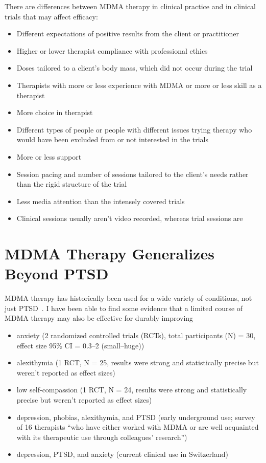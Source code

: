 \documentclass[11pt,oneside]{book}
\let\cite\parencite
\begin{document}
There are differences between MDMA therapy in clinical practice and in clinical trials that may affect efficacy:
\begin{itemize}
    \item Different expectations of positive results from the client or practitioner
    \item Higher or lower therapist compliance with professional ethics
    \item Doses tailored to a client's body mass, which did not occur during the trial~\cite{mitchellMDMAClinicalTrial,mitchellMDMAClinicalTrial2}
    \item Therapists with more or less experience with MDMA or more or less skill as a therapist
    \item More choice in therapist
    \item Different types of people or people with different issues trying therapy who would have been excluded from or not interested in the trials
    \item More or less support
    \item Session pacing and number of sessions tailored to the client's needs rather than the rigid structure of the trial
    \item Less media attention than the intensely covered trials
    \item Clinical sessions usually aren't video recorded, whereas trial sessions are
\end{itemize}

\section{MDMA Therapy Generalizes Beyond PTSD}
\label{biopsychosocial}
MDMA therapy has historically been used for a wide variety of conditions, not just PTSD~\cite{passieHistory}. I have been able to find some evidence that a limited course of MDMA therapy may also be effective for durably improving
\begin{itemize}
    \item anxiety (2 randomized controlled trials (RCTs), total participants (N) = 30, effect size 95\% CI = 0.3--2 (small--huge))~\cite{højlundGRADE}
    \item alexithymia (1 RCT, N = 25, results were strong and statistically precise but weren't reported as effect sizes)~\cite{vanSelfExperience}
    \item low self-compassion (1 RCT, N = 24, results were strong and statistically precise but weren't reported as effect sizes)~\cite{vanSelfExperience}
    \item depression, phobias, alexithymia, and PTSD (early underground use; survey of 16 therapists \enquote{who have either worked with MDMA or are well acquainted with its therapeutic use through colleagues' research}) \textcite[Association for the Responsible Use of Psychedelic Agents (1984), as cited in][ch. Early use in psychotherapy: A survey of MDMA therapists]{passieHistory}
    \item depression, PTSD, and anxiety (current clinical use in Switzerland)~\cite{liechtiSwitzerland}
\end{itemize}
\end{document}
